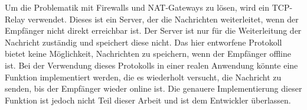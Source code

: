 Um die Problematik mit Firewalls und NAT-Gateways zu lösen, wird ein TCP-Relay verwendet. Dieses ist ein Server, der die Nachrichten weiterleitet, wenn der Empfänger nicht direkt erreichbar ist. Der Server ist nur für die Weiterleitung der Nachricht zuständig und speichert diese nicht. Das hier entworfene Protokoll bietet keine Möglichkeit, Nachrichten zu speichern, wenn der Empfänger offline ist. Bei der Verwendung dieses Protokolls in einer realen Anwendung könnte eine Funktion implementiert werden, die es wiederholt versucht, die Nachricht zu senden, bis der Empfänger wieder online ist. Die genauere Implementierung dieser Funktion ist jedoch nicht Teil dieser Arbeit und ist dem Entwickler überlassen.


